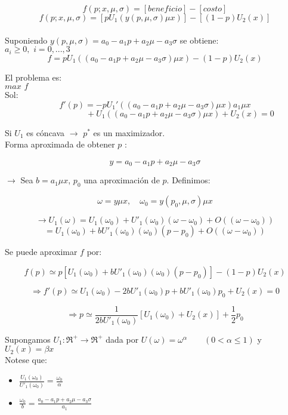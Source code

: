 \[f(p;x,\mu,\sigma)=[beneficio]-[costo]\]
\[f(p;x,\mu,\sigma)=[pU_1(y(p,\mu,\sigma)\mu x)]-[(1-p)U_2(x)]\]\\

Suponiendo $y(p,\mu,\sigma)=a_0-a_1p+a_2\mu-a_3\sigma$ se obtiene:\\

$a_i\ge 0,\,\,i=0,...,3$
\[f=pU_1((a_0-a_1p+a_2\mu-a_3\sigma)\mu x)-(1-p)U_2(x)\]

El problema es:\\

$max\,\,f$\\

Sol:\\

\[f'(p)=-pU_1'((a_0-a_1p+a_2\mu-a_3\sigma)\mu x)a_1\mu x\]
\[\qquad\qquad\qquad+U_1((a_0-a_1p+a_2\mu-a_3\sigma)\mu x)+U_2(x)=0\]

Si $U_1$ es cóncava $\rightarrow$ $p^*$ es un maximizador.\\

 Forma aproximada de obtener $p$ :
 
 \[y=a_0-a_1p+a_2\mu-a_3\sigma\]
 
 $\rightarrow$ Sea $b=a_1\mu x$, $p_0$ una aproximación de $p$. Definimos:
 
 \[\omega=y\mu x,\quad \omega_0=y(p_0,\mu,\sigma)\mu x\]
 
 \[\rightarrow U_1(\omega)=U_1(\omega_0)+U'_1(\omega_0)(\omega-\omega_0)+O((\omega-\omega_0))\] 
 \[=U_1(\omega_0)+bU'_1(\omega_0)(\omega_0)(p-p_0)+O((\omega-\omega_0))\]
 
 Se puede aproximar $f$ por:
 
 \[f(p)\simeq p[U_1(\omega_0)+bU'_1(\omega_0)(\omega_0)(p-p_0)]-(1-p)U_2(x)\]
 
 \[\Rightarrow f'(p)\simeq U_1(\omega_0)-2bU'_1(\omega_0)p+bU'_1(\omega_0)p_0+U_2(x)=0\]
 
 \[\Rightarrow p\simeq \frac{1}{2bU'_1(\omega_0)}[U_1(\omega_0)+U_2(x)]+\frac{1}{2}p_0\]
 
Supongamos $U_1:\Re^+ \rightarrow \Re^+$ dada por $U(\omega)=\omega^\alpha\qquad(0<\alpha\le1)$ y $U_2(x)=\beta x$\\

Notese que:
\begin{itemize}
 \item ${\displaystyle\frac{U_1(\omega_0)}{U'_1(\omega_0)}=\frac{\omega_0}{\alpha}}$
 \item ${\displaystyle\frac{\omega_0}{b}=\frac{a_0-a_1p+a_2\mu-a_3\sigma}{a_1}}$
\end{itemize}

